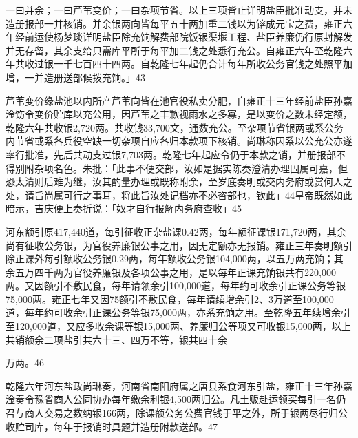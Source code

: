 
\noindent 一曰并余；一曰芦苇变价；一曰杂项节省。以上三项皆止详明盐臣批准动支，并未造册报部一并核销。并余银两向皆每平五十两加重二钱以为镕成元宝之费，雍正六年经前运使杨梦琰详明盐臣除充饷解费部院饭银渠堰工程、盐臣养廉仍行原封解发并无存留，其余支给只需库平所于每平加二钱之处悉行充公。自雍正六年至乾隆六年共收过银一千七百四十四两。自乾隆七年起仍合计每年所收公务官钱之处照平加增，一并造册送部候拨充饷。」43

芦苇变价缘盐池以内所产芦苇向皆在池官役私卖分肥，自雍正十三年经前盐臣孙嘉淦饬令变价贮库以充公用，因芦苇之丰歉视雨水之多寡，是以变价之数未经定额，乾隆六年共收银2,720两。共收钱33,700文，通数充公。至杂项节省银两或系公务内节省或系各兵役空缺一切杂项自应各归本款项下核销。尚琳称因系以公充公亦遂率行批准，先后共动支过银7,703两。乾隆七年起应令仍于本款之销，并册报部不得别附杂项名色。朱批：「此事不便交部，汝如是据实陈奏澄清办理固属可嘉，但恐太清则后难为继，汝其酌量办理或既称附余，至岁底奏明或交内务府或赏何人之处，请旨尚属可行之事耳，将此旨汝处记档亦不必咨部也，钦此」44皇帝既然如此暗示，吉庆便上奏折说：「奴才自行报解内务府查收」45

河东额引原417,440道，每引征收正杂盐课0.42两，每年额征课银171,720两，其余尚有征收公务银，为官役养廉银公事之用，因无定额亦无报销。雍正三年奏明额引除正课外每引额收公务银0.29两，每年额收公务银104,000两，以五万两充饷；其余五万四千两为官役养廉银及各项公事之用，是以每年正课充饷银共有220,000两。又因额引不敷民食，每年请领余引100,000道，每年约可收余引正课公务等银75,000两。雍正七年又因75额引不敷民食，每年请续增余引2、3万道至100,000道，每年约可收余引正课公务等银75,000两，亦系充饷之用。至乾隆五年续增余引至120,000道，又应多收余课等银15,000两、养廉归公等项又可收银15,000两，以上共销额余二项盐引共六十三、四万不等，银共四十余

\vfill
\begin{BookNotes}
\end{BookNotes}

\noindent 万两。46

乾隆六年河东盐政尚琳奏，河南省南阳府属之唐县系食河东引盐，雍正十三年孙嘉淦奏令豫省商人公同协办每年缴余利银4,500两归公。凡土贩赴运领买每引一名仍召与商人交易之数纳银166两，除课额公务公费官钱于平之外，所于银两尽行归公收贮司库，每年于报销时具题并造册附款送部。47

